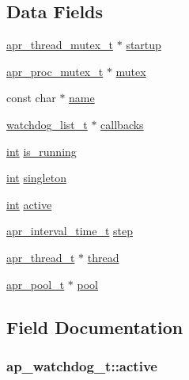 \subsection*{Data Fields}
\begin{DoxyCompactItemize}
\item 
\hyperlink{structapr__thread__mutex__t}{apr\+\_\+thread\+\_\+mutex\+\_\+t} $\ast$ \hyperlink{structap__watchdog__t_ae1d614a9ca65ae3e55f060c25fa37199}{startup}
\item 
\hyperlink{structapr__proc__mutex__t}{apr\+\_\+proc\+\_\+mutex\+\_\+t} $\ast$ \hyperlink{structap__watchdog__t_a2bcb402e5f0b3cec93484a9abf8f3e86}{mutex}
\item 
const char $\ast$ \hyperlink{structap__watchdog__t_ace3966c085982a7d27ebea4c5b84ec20}{name}
\item 
\hyperlink{structwatchdog__list__t}{watchdog\+\_\+list\+\_\+t} $\ast$ \hyperlink{structap__watchdog__t_ade63bd30fe2fd89b2fe77ea2a0a11c48}{callbacks}
\item 
\hyperlink{pcre_8txt_a42dfa4ff673c82d8efe7144098fbc198}{int} \hyperlink{structap__watchdog__t_a36ba975ff56ddbe0a8424ab7534f958e}{is\+\_\+running}
\item 
\hyperlink{pcre_8txt_a42dfa4ff673c82d8efe7144098fbc198}{int} \hyperlink{structap__watchdog__t_a3657a9720443f5c3a6e47f8e2ca6de79}{singleton}
\item 
\hyperlink{pcre_8txt_a42dfa4ff673c82d8efe7144098fbc198}{int} \hyperlink{structap__watchdog__t_afff464518fffd4b0ddb5e49d262b358a}{active}
\item 
\hyperlink{group__apr__time_gaae2129185a395cc393f76fabf4f43e47}{apr\+\_\+interval\+\_\+time\+\_\+t} \hyperlink{structap__watchdog__t_ae26c9c027d481bbe941943328e620c9c}{step}
\item 
\hyperlink{structapr__thread__t}{apr\+\_\+thread\+\_\+t} $\ast$ \hyperlink{structap__watchdog__t_a6bd7a4eef4d694a97b595051ed02e1d8}{thread}
\item 
\hyperlink{structapr__pool__t}{apr\+\_\+pool\+\_\+t} $\ast$ \hyperlink{structap__watchdog__t_a355828a65c24e3dff9b55340ac7c9025}{pool}
\end{DoxyCompactItemize}


\subsection{Field Documentation}
\subsubsection[{\texorpdfstring{active}{active}}]{ ap\+\_\+watchdog\+\_\+t\+::active}\hypertarget{structap__watchdog__t_afff464518fffd4b0ddb5e49d262b358a}{}\label{structap__watchdog__t_afff464518fffd4b0ddb5e49d262b358a}
